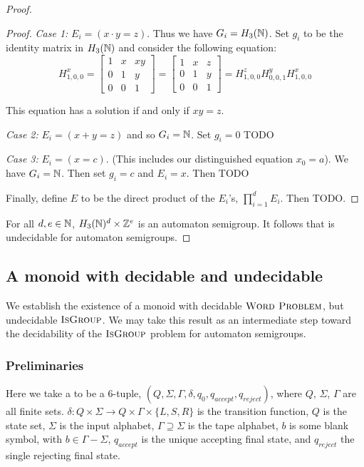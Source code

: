 \documentclass[11pt, titlepage]{article}
\begin{document}
\begin{proof}
\begin{proof}
  \textit{Case 1:} $E_i = (x \cdot y = z)$. Thus we have
  $G_i = H_3(\mathbb{N})$. Set $g_i$ to be the identity matrix in $H_3(\mathbb{N})$
  and consider the following equation:
  \[
    H^x_{1,0,0} =
    \begin{bmatrix}
      1 & x & xy \\
      0 & 1 & y \\
      0 & 0 & 1
    \end{bmatrix} = 
    \begin{bmatrix}
      1 & x & z \\
      0 & 1 & y \\
      0 & 0 & 1
    \end{bmatrix} = 
    H^z_{1,0,0} H^y_{0,0,1} H^x_{1,0,0}
  \]

  This equation has a solution if and only if $xy = z$.

  \textit{Case 2:} $E_i = (x+y=z)$ and so $G_i= \mathbb{N}$. Set $g_i = 0$ TODO

  \textit{Case 3:} $E_i = (x = c)$. (This includes our distinguished
  equation $x_0 = a$). We have $G_i = \mathbb{N}$. Then set $g_i = c$ and
  $E_i = x$. Then TODO

  Finally, define $E$ to be the direct product of the $E_i$'s,
  $\prod_{i=1}^d E_i$. Then TODO.
\end{proof} %

For all $d, e \in \mathbb{N}$, $H_3(\mathbb{N})^d \times \mathbb{Z}^e$ is an automaton
semigroup. It follows that  is
undecidable for automaton semigroups.

\end{proof} %

\subsection{A monoid with decidable  and undecidable } 

We establish the existence of a monoid with decidable
$\textsc{Word Problem}$, but undecidable $\textsc{IsGroup}$. We may
take this result as an intermediate step toward the decidability of
the $\textsc{IsGroup}$ problem for automaton semigroups.

\subsubsection*{Preliminaries}
Here we take a  to be a 6-tuple,
$(Q, \Sigma, \Gamma, \delta, q_0, q_{accept}, q_{reject})$, where $Q$,
$\Sigma$, $\Gamma$ are all finite sets.
$\delta : Q \times \Sigma \rightarrow Q\times \Gamma \times \{L,S,R\}$
is the transition function, $Q$ is the state set, $\Sigma$ is the
input alphabet, $\Gamma \supseteq \Sigma$ is the tape alphabet, $b$ is
some blank symbol, with $b \in \Gamma - \Sigma$, $q_{accept}$ is the
unique accepting final state, and $q_{reject}$ the single rejecting
final state.
\end{document}

